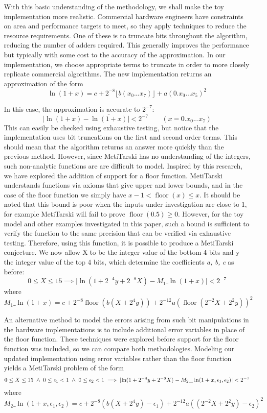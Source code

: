 \documentclass[a4paper]{article}
\newcommand{\abs}[1]{\lvert#1\rvert}
\newcommand{\floor}{\mathop{\textrm{floor}}\nolimits}
\begin{document}
With this basic understanding of the methodology, we shall make the toy implementation more realistic. Commercial hardware engineers have constraints on area and performance targets to meet, so they apply techniques to reduce the resource requirements. One of these is to truncate bits throughout the algorithm, reducing the number of adders required. This generally improves the performance but typically with some cost to the accuracy of the approximation. In our implementation, we choose appropriate terms to truncate in order to more closely replicate commercial algorithms. The new implementation returns an approximation of the form 
$$ \overline{\ln(1+x)}=c + 2^{-8} \lfloor{b(x_0...x_7)} \rfloor +a(0.x_0...x_5)^2 $$

\noindent In this case, the approximation is accurate to $2^{-7}$: 
\[ 
\abs{\ln(1+x)-\overline{\ln(1+x)}} <2^{-7} \qquad (x= 0.x_0...x_7) \]
This can easily be checked using exhaustive testing, but notice that the implementation uses bit truncations on the first and second order terms. This should mean that the algorithm returns an answer more quickly than the previous method. However, since MetiTarski has no understanding of the integers, such non-analytic functions are are difficult to model. Inspired by this research, we have explored the addition of support for a floor function. MetiTarski understands functions via axioms that give upper and lower bounds, and in the case of the floor function we simply have $x-1< \floor(x)\le x$. It should be noted that this bound is poor when the inputs under investigation are close to 1, for example MetiTarski will fail to prove $\floor(0.5)\geq 0$.
However, for the toy model and other examples investigated in this paper, such a bound is sufficient to verify the function to the same precision that can be verified via exhaustive testing. Therefore, using this function, it is possible to produce a MetiTarski conjecture. We now allow X to be the integer value of the bottom 4 bits and y the integer value of the top 4 bits, which determine the coefficients \textit{a, b, c} as before:
\[
0\le X \le 15 \implies \abs{\ln(1+2^{-4}y+2^{-8}X) - M_1\_\ln(1+x)} <2^{-7}
\]
where $$M_1\_\ln(1+x)=c+2^{-8}\floor(b(X+2^{4}y))+2^{-12}a(\floor(2^{-2}X+2^{2}y))^2$$

An alternative method to model the errors arising from such bit manipulations in the hardware implementations is to include additional error variables in place of the floor function. These techniques were explored before support for the floor function was included, so we can compare both methodologies. Modeling our updated implementation using error variables rather than the floor function yields a MetiTarski problem of the form
$$	0\le X \le 15 \hspace{0.1cm} \land \hspace{0.1cm} 0\le \epsilon_1<1\hspace{0.1cm} \land \hspace{0.1cm} 0\le \epsilon_2<1 \newline
\implies \abs{\ln(1+2^{-4}y+2^{-8}X) - M_2\_\ln(1+x,\epsilon_1,\epsilon_2)} < 2^{-7}$$
where
$$M_2\_\ln(1+x,\epsilon_1,\epsilon_2)=c+2^{-8}(b(X+2^{4}y)-\epsilon_1)+2^{-12}a((2^{-2}X+2^{2}y)-\epsilon_2)^2$$
\end{document}
